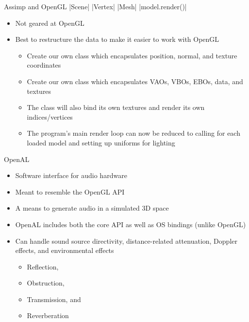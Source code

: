 \documentclass{beamer}
\begin{document}
\begin{frame}[fragile]{Assimp and OpenGL}
    |Scene|
    |Vertex|
    |Mesh|
    |model.render()|
    \begin{itemize}
        \item Not geared at OpenGL
        \item Best to restructure the {\color{blue}} data to make it easier to work with OpenGL
              \begin{itemize}
                  \item Create our own {\color{blue}} class which encapsulates position, normal, and texture
                        coordinates
                  \item Create our own {\color{blue}} class which encapsulates VAOs, VBOs, EBOs,
                        {\color{blue}} data, and textures
                  \item The {\color{blue}} class will also bind its own textures and render its own indices/vertices
                  \item The program's main render loop can now be reduced to calling {\color{blue}} for
                        each loaded model and setting up uniforms for lighting
              \end{itemize}
    \end{itemize}
\end{frame}

\begin{frame}[fragile]{OpenAL}
    \begin{itemize}
        \item Software interface for audio hardware
        \item Meant to resemble the OpenGL API
        \item A means to generate audio in a simulated 3D space
        \item OpenAL includes both the core API as well as OS bindings (unlike OpenGL)
        \item Can handle sound source directivity, distance-related attenuation, Doppler effects, and environmental
              effects
              \begin{itemize}
                  \item Reflection,
                  \item Obstruction,
                  \item Transmission, and
                  \item Reverberation
              \end{itemize}
    \end{itemize}
\end{frame}
\end{document}

